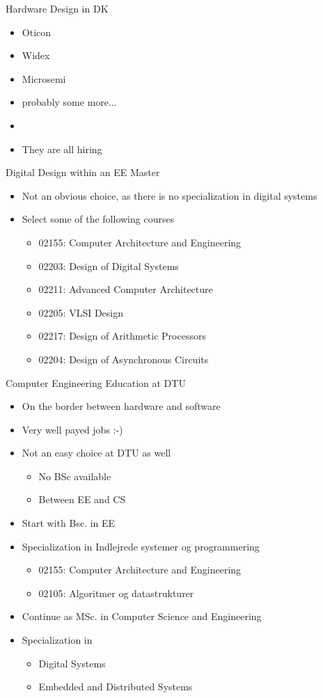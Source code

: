 \documentclass[xcolor=pdflatex,dvipsnames,table]{beamer}
\begin{document}
\begin{frame}[fragile]{Hardware Design in DK}
\begin{itemize}
\item Oticon
\item Widex
\item Microsemi
\item probably some more...
\item 
\item They are all hiring
\end{itemize}
\end{frame}

\begin{frame}[fragile]{Digital Design within an EE Master}
\begin{itemize}
\item Not an obvious choice, as there is no specialization in digital systems
\item Select some of the following courses
\begin{itemize}
\item 02155: Computer Architecture and Engineering
\item 02203: Design of Digital Systems
\item 02211: Advanced Computer Architecture
\item 02205: VLSI Design
\item 02217: Design of Arithmetic Processors
\item 02204: Design of Asynchronous Circuits
\end{itemize}
\end{itemize}
\end{frame}

\begin{frame}[fragile]{Computer Engineering Education at DTU}
\begin{itemize}
\item On the border between hardware and software
\item Very well payed jobs :-)
\item Not an easy choice at DTU as well
\begin{itemize}
\item No BSc available
\item Between EE and CS
\end{itemize}
\item Start with Bsc. in EE
\item Specialization in Indlejrede systemer og programmering
\begin{itemize}
\item 02155: Computer Architecture and Engineering
\item 02105: Algoritmer og datastrukturer
\end{itemize}
\item Continue as MSc. in Computer Science and Engineering
\item Specialization in
\begin{itemize}
\item Digital Systems
\item Embedded and Distributed Systems
\end{itemize}
\end{itemize}
\end{frame}
\end{document}
